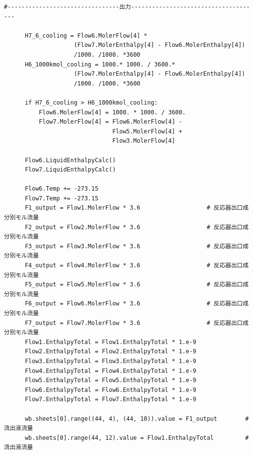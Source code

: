 \documentclass[a4j]{jsreport}
\begin{document}
\begin{lstlisting}[caption=気液反応器の解析(迅速に平衡)]
      #--------------------------------出力-------------------------------------

      H7_6_cooling = Flow6.MolerFlow[4] *
                    (Flow7.MolerEnthalpy[4] - Flow6.MolerEnthalpy[4])
                    /1000. /1000. *3600
      H6_1000kmol_cooling = 1000.* 1000. / 3600.*
                    (Flow7.MolerEnthalpy[4] - Flow6.MolerEnthalpy[4])
                    /1000. /1000. *3600

      if H7_6_cooling > H6_1000kmol_cooling:
          Flow6.MolerFlow[4] = 1000. * 1000. / 3600.
          Flow7.MolerFlow[4] = Flow6.MolerFlow[4] -
                               Flow5.MolerFlow[4] +
                               Flow3.MolerFlow[4]

      Flow6.LiquidEnthalpyCalc()
      Flow7.LiquidEnthalpyCalc()

      Flow6.Temp += -273.15
      Flow7.Temp += -273.15
      F1_output = Flow1.MolerFlow * 3.6                   # 反応器出口成分別モル流量
      F2_output = Flow2.MolerFlow * 3.6                   # 反応器出口成分別モル流量
      F3_output = Flow3.MolerFlow * 3.6                   # 反応器出口成分別モル流量
      F4_output = Flow4.MolerFlow * 3.6                   # 反応器出口成分別モル流量
      F5_output = Flow5.MolerFlow * 3.6                   # 反応器出口成分別モル流量
      F6_output = Flow6.MolerFlow * 3.6                   # 反応器出口成分別モル流量
      F7_output = Flow7.MolerFlow * 3.6                   # 反応器出口成分別モル流量
      Flow1.EnthalpyTotal = Flow1.EnthalpyTotal * 1.e-9
      Flow2.EnthalpyTotal = Flow2.EnthalpyTotal * 1.e-9
      Flow3.EnthalpyTotal = Flow3.EnthalpyTotal * 1.e-9
      Flow4.EnthalpyTotal = Flow4.EnthalpyTotal * 1.e-9
      Flow5.EnthalpyTotal = Flow5.EnthalpyTotal * 1.e-9
      Flow6.EnthalpyTotal = Flow6.EnthalpyTotal * 1.e-9
      Flow7.EnthalpyTotal = Flow7.EnthalpyTotal * 1.e-9

      wb.sheets[0].range((44, 4), (44, 10)).value = F1_output        # 流出液流量
      wb.sheets[0].range(44, 12).value = Flow1.EnthalpyTotal         # 流出液流量


\end{lstlisting}
\end{document}
